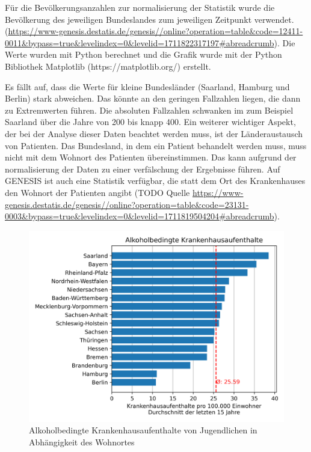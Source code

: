 \documentclass{article}
\begin{document}
Für die Bevölkerungsanzahlen zur normalisierung der Statistik wurde die Bevölkerung des jeweiligen Bundeslandes zum jeweiligen Zeitpunkt verwendet. (\url{https://www-genesis.destatis.de/genesis//online?operation=table&code=12411-0011&bypass=true&levelindex=0&levelid=1711822317197#abreadcrumb}). Die Werte wurden mit Python berechnet und die Grafik wurde mit der Python Bibliothek Matplotlib (https://matplotlib.org/) erstellt. 

Es fällt auf, dass die Werte für kleine Bundesländer (Saarland, Hamburg und Berlin) stark abweichen. Das könnte an den geringen Fallzahlen liegen, die dann zu Extremwerten führen. Die absoluten Fallzahlen schwanken im zum Beispiel Saarland über die Jahre von 200 bis knapp 400. Ein weiterer wichtiger Aspekt, der bei der Analyse dieser Daten beachtet werden muss, ist der Länderaustausch von Patienten. Das Bundesland, in dem ein Patient behandelt werden muss, muss nicht mit dem Wohnort des Patienten übereinstimmen. Das kann aufgrund der normalisierung der Daten zu einer verfälschung der Ergebnisse führen. Auf GENESIS ist auch eine Statistik verfügbar, die statt dem Ort des Krankenhauses den Wohnort der Patienten angibt (TODO Quelle \url{https://www-genesis.destatis.de/genesis//online?operation=table&code=23131-0003&bypass=true&levelindex=0&levelid=1711819504204#abreadcrumb}).

\begin{figure}[h]
    \centering
    \includegraphics[scale=.7]{"assets/Alkohol_Wohnort_avg_15_Jahre.png"}
    \caption{Alkoholbedingte Krankenhausaufenthalte von Jugendlichen in Abhängigkeit des Wohnortes}
    \label{fig}
\end{figure}
\end{document}
